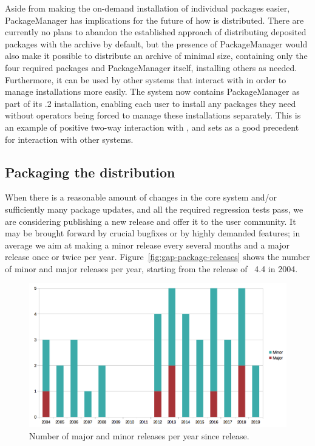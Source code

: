 Aside from making the on-demand installation of individual packages easier, {\sf
  PackageManager} has implications for the future of how \GAP is distributed.
There are currently no plans to abandon the established approach of distributing
deposited packages with the \GAP archive by default, but the presence of {\sf
  PackageManager} would also make it possible to distribute an archive of
minimal size, containing only the four required packages and {\sf
  PackageManager} itself, installing others as needed.  Furthermore, it
can be used by other systems that interact with \GAP in order to manage
installations more easily.  The \cocalc system now contains {\sf PackageManager}
as part of its .2 installation, enabling each user to install any
packages they need without \cocalc operators being forced to manage these
installations separately.  This is an example of positive two-way interaction
with \cocalc, and sets as a good precedent for interaction with other
systems.

\subsection{Packaging the \GAP distribution}\label{distro}


When there is a reasonable amount of changes in the core \GAP system
and/or sufficiently many package updates, and all the required
regression tests pass, we are considering publishing a new \GAP release
and offer it to the user community. It may be 
brought forward by crucial bugfixes or by highly demanded features;
in average we aim at making a minor release every several months 
and a major release once or twice per year. 
Figure~\ref{fig:gap-package-releases} shows the number of minor
and major \GAP releases per year, starting from the release of
\GAP~4.4 in 2004.

\begin{figure}[!ht]
    \centering
    \includegraphics[width=\textwidth]{images/gap-releases}
    \caption{Number of major and minor \GAP releases per year since  release.}
    \label{fig:gap-releases}
\end{figure}

